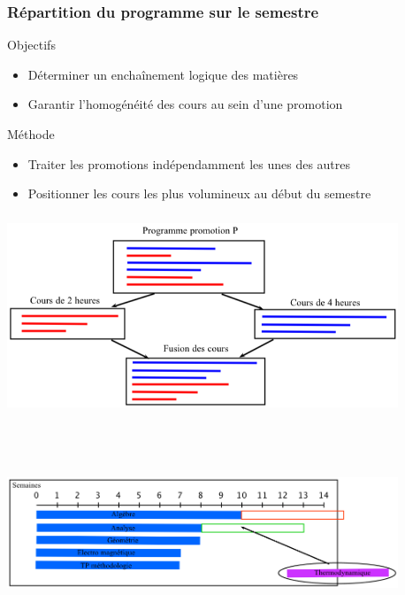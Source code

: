 \documentclass{beamer}
\begin{document}
\begin{frame}
\frametitle{Répartition du programme sur le semestre}
\begin{block}{Objectifs}
\begin{itemize}
\item Déterminer un enchaînement logique des matières
\item Garantir l'homogénéité des cours au sein d'une promotion
\end{itemize}
\end{block}
\vspace{\baselineskip}
\begin{block}{Méthode}
\begin{itemize}
\item Traiter les promotions indépendamment les unes des autres
\item Positionner les cours les plus volumineux au début du semestre
\end{itemize}
\end{block}
\end{frame}

\begin{frame}
\begin{center}
\includegraphics [width=117mm, height=60mm]{Dessin1.png}
\end{center}
\end{frame}

\begin{frame}
\begin{center}
\includegraphics [width=117mm, height=60mm]{RepartitionSemestre2.png}
\end{center}
\end{frame}
\end{document}
